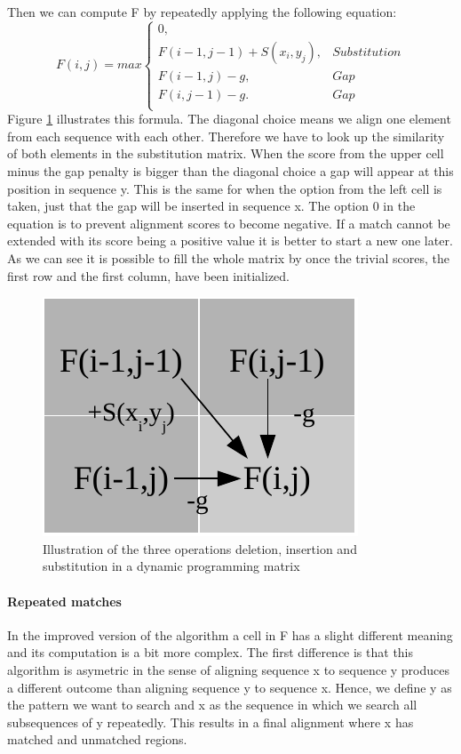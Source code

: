 Then we can compute F by repeatedly applying the following equation:
\begin{equation}
F(i,j) = max \left\{ \begin{array}{lr}0,&\\F(i-1,j-1)+S(x_i,y_j),&Substitution\\F(i-1,j)-g,&Gap\\F(i,j-1)-g.&Gap\\\end{array} \right. 
\end{equation}
Figure \ref{fig:basicalignmentoperations} illustrates this formula. The diagonal choice means we align one element from each sequence with each other. Therefore we have to look up the similarity of both elements in the substitution matrix. 
When the score from the upper cell minus the gap penalty is bigger than the diagonal choice a gap will appear at this position in sequence y. 
This is the same for when the option from the left cell is taken, just that the gap will be inserted in sequence x. 
The option 0 in the equation is to prevent alignment scores to become negative. 
If a match cannot be extended with its score being a positive value it is better to start a new one later. 
As we can see it is possible to fill the whole matrix by once the trivial scores, the first row and the first column, have been initialized.

\begin{figure}
	\centering
	\includegraphics{img/basic_cell_fill.pdf}
	\caption{Illustration of the three operations deletion, insertion and substitution in a dynamic programming matrix}
	\label{fig:basicalignmentoperations}
\end{figure}

\paragraph{Repeated matches}
In the improved version of the algorithm a cell in F has a slight different meaning and its computation is a bit more complex. 
The first difference is that this algorithm is asymetric in the sense of aligning sequence x to sequence y produces a different outcome than aligning sequence y to sequence x. Hence, we define y as the pattern we want to search and x as the sequence in which we search all subsequences of y repeatedly.
This results in a final alignment where x has matched and unmatched regions.  


